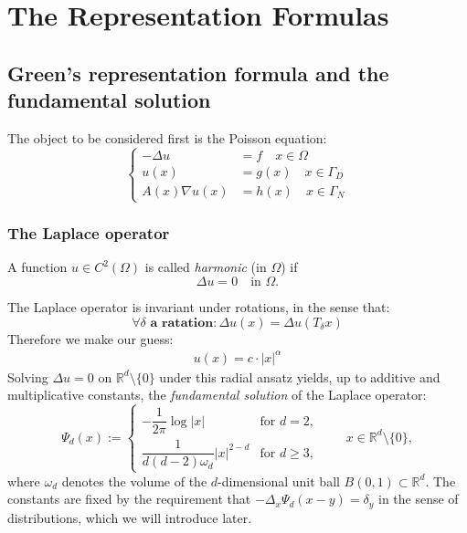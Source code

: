 \section{The Representation Formulas}
\subsection{Green's representation formula and the fundamental solution}
The object to be considered first is the Poisson equation:
\begin{equation}\label{PE}
\left\{
\begin{aligned}
	-\Delta u &= f  \quad x \in \Omega\\
	u(x) &= g(x) \quad x \in \Gamma_D\\
	A(x)\nabla u(x) &= h(x) \quad x \in \Gamma_N
\end{aligned}
\right.	
\end{equation}

\subsubsection{The Laplace operator}
\begin{definition}
	A function $u \in C^2(\Omega)$ is called \emph{harmonic} (in $\Omega$) if
	\begin{equation*}
		\Delta u = 0 \quad \text{in } \Omega.
	\end{equation*}
\end{definition}

The Laplace operator is invariant under rotations, in the sense that:
\begin{equation*}
	\forall \delta \textbf{ a ratation} : \Delta u(x) = \Delta  u(T_\delta x)
\end{equation*}
Therefore we make our guess:
\begin{align*}
	u(x) = c \cdot |x|^\alpha
\end{align*}
Solving $\Delta u = 0$ on $\mathbb{R}^d \setminus \{0\}$ under this radial ansatz yields, up to additive and multiplicative constants, the \emph{fundamental solution} of the Laplace operator:
\begin{equation}\label{eq:fund-sol-laplace}
	\Psi_d(x) :=
	\begin{cases}
		-\dfrac{1}{2\pi} \log |x| & \text{for } d = 2,\\[6pt]
		\dfrac{1}{d(d - 2)\omega_d} |x|^{2 - d} & \text{for } d \geq 3,
	\end{cases}
	\qquad x \in \mathbb{R}^d \setminus \{0\},
\end{equation}
where $\omega_d$ denotes the volume of the $d$-dimensional unit ball $B(0, 1) \subset \mathbb{R}^d$. 
The constants are fixed by the requirement that $-\Delta_x \Psi_d(x - y) = \delta_y$ in the sense of distributions, which we will introduce later.


